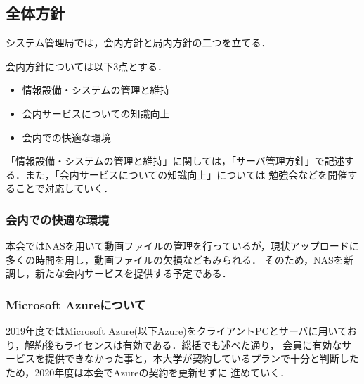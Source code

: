 \subsection*{全体方針}


システム管理局では，会内方針と局内方針の二つを立てる．

会内方針については以下3点とする．
\begin{itemize}
    \item 情報設備・システムの管理と維持
    \item 会内サービスについての知識向上
    \item 会内での快適な環境
\end{itemize}

「情報設備・システムの管理と維持」に関しては，「サーバ管理方針」で記述する．また，「会内サービスについての知識向上」については
勉強会などを開催することで対応していく．
\subsubsection*{会内での快適な環境}
本会ではNASを用いて動画ファイルの管理を行っているが，現状アップロードに多くの時間を用し，動画ファイルの欠損などもみられる．
そのため，NASを新調し，新たな会内サービスを提供する予定である．

\subsubsection*{Microsoft Azureについて}
2019年度ではMicrosoft Azure(以下Azure)をクライアントPCとサーバに用いており，解約後もライセンスは有効である．総括でも述べた通り，
会員に有効なサービスを提供できなかった事と，本大学が契約しているプランで十分と判断したため，2020年度は本会でAzureの契約を更新せずに
進めていく．



  